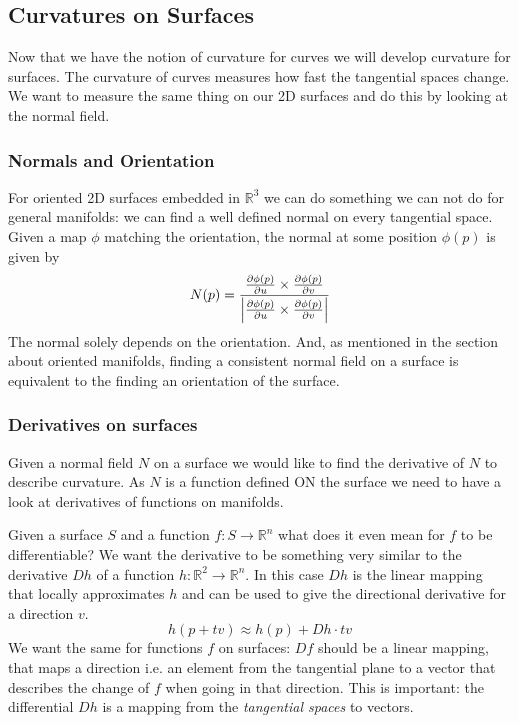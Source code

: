 \subsection{Curvatures on Surfaces}
Now that we have the notion of curvature for curves we will develop curvature for surfaces. The curvature of curves measures how fast the tangential spaces change. We want to measure the same thing on our 2D surfaces and do this by looking at the normal field.

\subsubsection{Normals and Orientation}
For oriented 2D surfaces embedded in $\mathbb R^3$ we can do something we can not do for general manifolds: we can find a well defined normal on every tangential space. Given a map $\phi$ matching the orientation, the normal at some position $\phi(p)$ is given by
\[N(p) = \frac{\frac{\partial \phi(p)} {\partial u} \times \frac{\partial \phi(p)} {\partial v}}{\left| \frac{\partial \phi(p)} {\partial u} \times \frac{\partial \phi(p)} {\partial v} \right|}\]
The normal solely depends on the orientation. And, as mentioned in the section about oriented manifolds, finding a consistent normal field on a surface is equivalent to the finding an orientation of the surface.

\subsubsection{Derivatives on surfaces}
Given a normal field $N$ on a surface we would like to find the derivative of $N$ to describe curvature. As $N$ is a function defined ON the surface we need to have a look at derivatives of functions on manifolds.

Given a surface $S$ and a function $f: S \rightarrow \mathbb R^n$ what does it even mean for $f$ to be differentiable? We want the derivative to be something very similar to the derivative $Dh$ of a function $h: \mathbb R^2 \rightarrow \mathbb R^n$. In this case $Dh$ is the linear mapping that locally approximates $h$ and can be used to give the directional derivative for a direction $v$.
\[h( p + tv) \approx h(p) + Dh \cdot tv\]
We want the same for functions $f$ on surfaces: $Df$ should be a linear mapping, that maps a direction i.e. an element from the tangential plane to a vector that describes the change of $f$ when going in that direction. This is important: the differential $Dh$ is a mapping from the \emph{tangential spaces} to vectors. 

